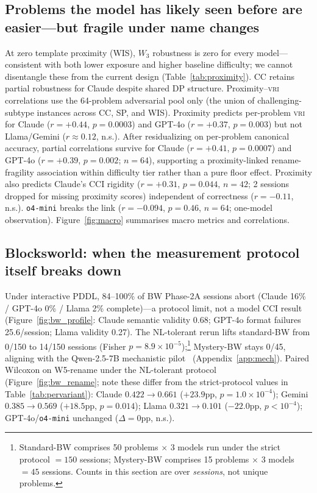 \documentclass{article}
\newcommand{\omini}{\texttt{o4-mini}}     %
\newcommand{\wthree}{\ensuremath{W_3}}
\newcommand{\vri}{\textsc{vri}}
\begin{document}
\subsection{Problems the model has likely seen before are easier---but fragile under name changes}
\label{sec:proximity}

At zero template proximity (WIS), \wthree{} robustness is zero for every
model---consistent with both lower exposure and higher baseline difficulty;
we cannot disentangle these from the current design (Table~\ref{tab:proximity}).
CC retains partial robustness for Claude despite shared DP structure.
Proximity--\vri{} correlations use the 64-problem adversarial pool only (the
union of challenging-subtype instances across CC, SP, and WIS).
Proximity predicts per-problem \vri{} for Claude ($r{=}{+}0.44$,
$p{=}0.0003$) and GPT-4o ($r{=}{+}0.37$, $p{=}0.003$) but not Llama/Gemini
($r{\approx}0.12$, n.s.). After residualizing on per-problem canonical
accuracy, partial correlations survive for Claude ($r{=}{+}0.41$,
$p{=}0.0007$) and GPT-4o ($r{=}{+}0.39$, $p{=}0.002$; $n{=}64$), supporting a
proximity-linked rename-fragility association within difficulty tier rather
than a pure floor effect. Proximity also predicts Claude's CCI rigidity
($r{=}{+}0.31$, $p{=}0.044$, $n{=}42$; 2 sessions dropped for missing
proximity scores) independent of correctness
($r{=}{-}0.11$, n.s.). \omini{} breaks the link ($r{=}{-}0.094$, $p{=}0.46$,
$n{=}64$; one-model observation). Figure~\ref{fig:macro} summarises macro
metrics and correlations.



\subsection{Blocksworld: when the measurement protocol itself breaks down}
\label{sec:bw}

Under interactive PDDL, 84--100\% of BW Phase-2A sessions abort (Claude 16\%
/ GPT-4o 0\% / Llama 2\% complete)---a protocol limit, not a model CCI result
(Figure~\ref{fig:bw_profile}: Claude semantic validity 0.68; GPT-4o format
failures 25.6/session; Llama validity 0.27). The NL-tolerant rerun lifts
standard-BW from 0/150 to 14/150 sessions (Fisher
$p{=}8.9{\times}10^{-5}$);\footnote{Standard-BW comprises 50 problems
$\times$ 3 models run under the strict protocol $=150$ sessions; Mystery-BW
comprises 15 problems $\times$ 3 models $=45$ sessions. Counts in this
section are over \emph{sessions}, not unique problems.} Mystery-BW stays
0/45, aligning with the Qwen-2.5-7B mechanistic
pilot~\citep{qwen2025technical} (Appendix~\ref{app:mech}). Paired Wilcoxon on W5-rename under the NL-tolerant protocol
(Figure~\ref{fig:bw_rename}; note these differ from the strict-protocol
values in Table~\ref{tab:pervariant}): Claude $0.422{\to}0.661$
(${+}23.9$pp, $p{=}1.0{\times}10^{-4}$); Gemini $0.385{\to}0.569$
(${+}18.5$pp, $p{=}0.014$); Llama $0.321{\to}0.101$ (${-}22.0$pp,
$p{<}10^{-4}$); GPT-4o/\omini{} unchanged ($\Delta{=}0$pp, n.s.).
\end{document}
